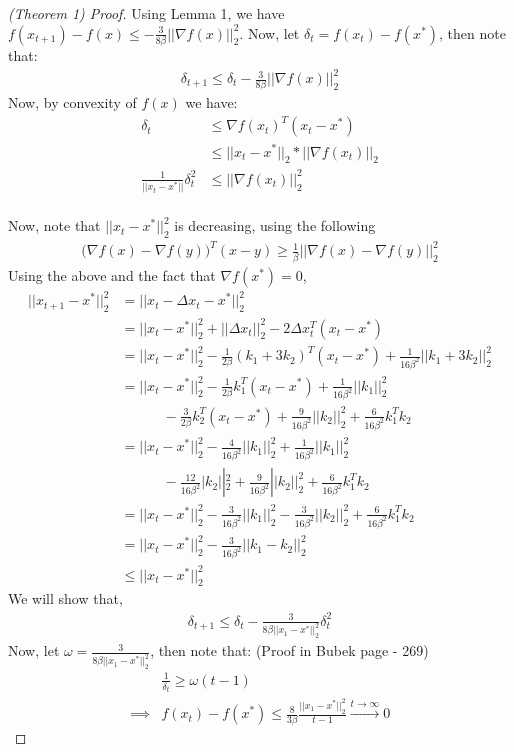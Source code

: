 \documentclass[12pt,twoside]{article}
\begin{document}
\begin{proof}[(Theorem 1) Proof]
Using Lemma 1, we have $f(x_{t+1}) - f(x) \leq -\frac{3}{8\beta}|| \nabla f(x) ||_2^2 $. Now, let $\delta_t = f(x_t) - f(x^*)$, then note that:
\begin{align*}
\delta_{t+1} \leq \delta_t - \frac{3}{8\beta}|| \nabla f(x) ||_2^2
\end{align*}
Now, by convexity of $f(x)$ we have:
\begin{align}
\delta_t &\leq \nabla f(x_t)^T (x_t - x^*) \\
 &\leq || x_t - x^* ||_2 * || \nabla f(x_t) ||_2 \\
\frac{1}{|| x_t - x^* || }\delta_t^2 & \leq  || \nabla f(x_t) ||_2^2 \\
\end{align}

Now, note that $|| x_t - x^*||_2^2$ is decreasing, using the following
\begin{align*}
\big( \nabla f(x) - \nabla f(y)  \big)^T(x-y)  \geq \frac{1}{\beta} || \nabla f(x) - \nabla f(y) ||_2^2
\end{align*}
Using the above and the fact that $\nabla f(x^*) = 0$,
\begin{align*}
|| x_{t+1} - x^* ||_2^2 &= || x_t - \Delta x_t - x^* ||_2^2 \\
&= || x_t - x^* ||_2^2 + || \Delta x_t ||_2^2 - 2 \Delta x_t^T(x_t - x^*) \\
&= || x_t - x^* ||_2^2 - \frac{1}{2\beta}(k_1 + 3k_2)^T (x_t - x^*) + \frac{1}{16 \beta^2}|| k_1 + 3k_2 ||_2^2 \\
&= || x_t - x^* ||_2^2 - \frac{1}{2 \beta}k_1^T (x_t - x^*) + \frac{1}{16 \beta^2}|| k_1 ||_2^2  \\
& \quad \quad \quad - \frac{3}{2\beta}k_2^T (x_t - x^*) + \frac{9}{16 \beta^2}|| k_2 ||_2^2 + \frac{6}{16 \beta^2} k_1 ^T k_2 \\
&= || x_t - x^* ||_2^2 - \frac{4}{16 \beta^2}||k_1 ||_2^2 + \frac{1}{16 \beta^2}|| k_1 ||_2^2  \\
& \quad \quad \quad - \frac{12}{16 \beta^2}|k_2||_2^2 + \frac{9}{16 \beta^2}|| k_2 ||_2^2 + \frac{6}{16 \beta^2} k_1 ^T k_2 \\
&= || x_t - x^* ||_2^2 - \frac{3}{16 \beta^2}||k_1||_2^2 - \frac{3}{16 \beta^2}||k_2||_2^2 + \frac{6}{16 \beta^2} k_1 ^T k_2 \\
&= || x_t - x^* ||_2^2 -  \frac{3}{16 \beta^2}|| k_1 - k_2||_2^2	\\
& \leq || x_t - x^* ||_2^2
\end{align*}
We will show that,
\begin{align}
\delta_{t+1} \leq \delta_t - \frac{3}{ 8 \beta || x_1 - x^* ||_2^2} \delta_t^2
\end{align}
Now, let $\omega = \frac{3}{8 \beta   || x_1 - x^* ||_2^2}$, then note that: (Proof in Bubek page - 269)
\begin{align*}
& \frac{1}{\delta_t} \geq \omega (t-1) \\
\implies & f(x_t) - f(x^*) \leq \frac{8}{3 \beta} \frac{ || x_1 - x^* ||_2^2}{t-1} \xrightarrow{t \to \infty} 0
\end{align*}
\end{proof}
\end{document}
